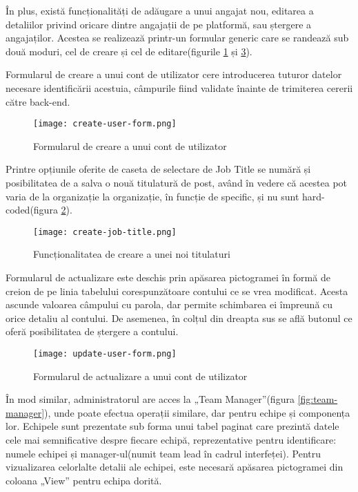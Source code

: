 În plus, există funcționalități de adăugare a unui angajat nou, editarea a detaliilor privind oricare dintre angajații de pe platformă, sau ștergere a angajaților. Acestea se realizează printr-un formular generic care se randează sub două moduri, cel de creare și cel de editare(figurile \ref{fig:user-form-create} și \ref{fig:user-form-update}).

Formularul de creare a unui cont de utilizator cere introducerea tuturor datelor necesare identificării acestuia, câmpurile fiind validate înainte de trimiterea cererii către back-end.

 \begin{figure}[H]
	\centering
 	 \texttt{[image: create-user-form.png]}
	\caption{Formularul de creare a unui cont de utilizator}
	\label{fig:user-form-create}
 \end{figure}

Printre opțiunile oferite de caseta de selectare de Job Title se numără și posibilitatea de a salva o nouă titulatură de post, având în vedere că acestea pot varia de la organizație la organizație, în funcție de specific, și nu sunt hard-coded(figura \ref{fig:create-job-title}).

 \begin{figure}[H]
	\centering
 	 \texttt{[image: create-job-title.png]}
	\caption{Funcționalitatea de creare a unei noi titulaturi}
	\label{fig:create-job-title}
 \end{figure}

Formularul de actualizare este deschis prin apăsarea pictogramei în formă de creion de pe linia tabelului corespunzătoare contului ce se vrea modificat. Acesta ascunde valoarea câmpului cu parola, dar permite schimbarea ei împreună cu orice detaliu al contului. De asemenea, în colțul din dreapta sus se află butonul ce oferă posibilitatea de ștergere a contului.

 \begin{figure}[H]
	\centering
 	 \texttt{[image: update-user-form.png]}
	\caption{Formularul de actualizare a unui cont de utilizator}
	\label{fig:user-form-update}
 \end{figure}

În mod similar, administratorul are acces la „Team Manager”(figura \ref{fig:team-manager}), unde poate efectua operații similare, dar pentru echipe și componența lor. Echipele sunt prezentate sub forma unui tabel paginat care prezintă datele cele mai semnificative despre fiecare echipă, reprezentative pentru identificare: numele echipei și manager-ul(numit team lead în cadrul interfeței). Pentru vizualizarea celorlalte detalii ale echipei, este necesară apăsarea pictogramei din coloana „View” pentru echipa dorită.

